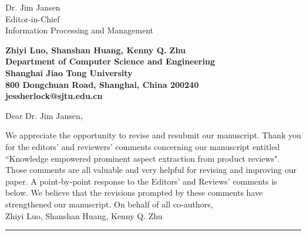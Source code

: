 \documentclass[11pt]{letter} %
\begin{document}
	
	
	\begin{letter}{Dr. Jim Jansen \\
			Editor-in-Chief  \\
			Information Processing and Management} 
		
		
		\begin{center}
			\large\bf Zhiyi Luo, Shanshan Huang, Kenny Q. Zhu \\ %
			Department of Computer Science and Engineering \\ Shanghai Jiao Tong University \\ 800 Dongchuan Road, Shanghai, China 200240 \\
			jessherlock@sjtu.edu.cn
		\end{center} 
		\vfill
		
		\signature{Zhiyi Luo} %
		
		
		\opening{Dear Dr. Jim Jansen,} 
		
		We appreciate the opportunity to revise and resubmit our manuscript. 
		Thank you for the editors' and reviewers' comments concerning our 
		manuscript entitled ``Knowledge empowered prominent aspect extraction from product reviews". Those comments are all valuable and very helpful
		for revising and improving our paper.
		A point-by-point response to the Editors' and Reviews' comments is below. 
		We believe that the revisions prompted by these comments have strengthened our manuscript.
		\newline\newline
		On behalf of all co-authors,\\
		Zhiyi Luo, Shanshan Huang, Kenny Q. Zhu
		\newline\hrule


\end{letter}
\end{document}
